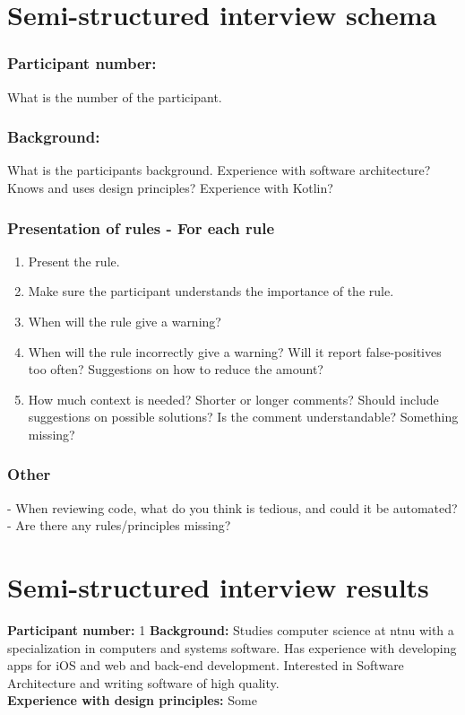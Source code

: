 \clearpage

\section{Semi-structured interview schema}
\label{semi-structured-interview-schema}
\subsubsection*{Participant number:} What is the number of the participant.
\subsubsection*{Background:} What is the participants background. Experience with software architecture? Knows and uses design principles? Experience with Kotlin?
\subsubsection*{Presentation of rules - For each rule}
\begin{enumerate}
    \item Present the rule. 
    \item Make sure the participant understands the importance of the rule.
    \item When will the rule give a warning?
    \item When will the rule incorrectly give a warning? Will it report false-positives too often? Suggestions on how to reduce the amount?
    \item How much context is needed? Shorter or longer comments? Should include suggestions on possible solutions? Is the comment understandable? Something missing?
\end{enumerate}

\subsubsection*{Other} 
- When reviewing code, what do you think is tedious, and could it be automated?
- Are there any rules/principles missing?

\clearpage
\section{Semi-structured interview results}
\label{horizontal-prototype-interview-results}

\textbf{Participant number:} 1 \newline
\textbf{Background:} Studies computer science at \gls{ntnu} with a specialization in computers and systems software. Has experience with developing apps for iOS and web and back-end development. Interested in Software Architecture and writing software of high quality. \\
\textbf{Experience with design principles:} Some \\\\

